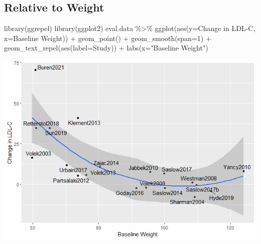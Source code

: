 \documentclass[
]{article}
\newenvironment{Shaded}{\begin{snugshade}}{\end{snugshade}}
\newcommand{\AttributeTok}[1]{\textcolor[rgb]{0.77,0.63,0.00}{#1}}
\newcommand{\DecValTok}[1]{\textcolor[rgb]{0.00,0.00,0.81}{#1}}
\newcommand{\FunctionTok}[1]{\textcolor[rgb]{0.00,0.00,0.00}{#1}}
\newcommand{\NormalTok}[1]{#1}
\newcommand{\SpecialCharTok}[1]{\textcolor[rgb]{0.00,0.00,0.00}{#1}}
\newcommand{\StringTok}[1]{\textcolor[rgb]{0.31,0.60,0.02}{#1}}
\begin{document}
\hypertarget{relative-to-weight}{%
\subsection{Relative to Weight}\label{relative-to-weight}}

\begin{Shaded}
\begin{Highlighting}[]
\FunctionTok{library}\NormalTok{(ggrepel)}
\FunctionTok{library}\NormalTok{(ggplot2)}
\NormalTok{eval.data }\SpecialCharTok{\%\textgreater{}\%}
  \FunctionTok{ggplot}\NormalTok{(}\FunctionTok{aes}\NormalTok{(}\AttributeTok{y=}\StringTok{\textasciigrave{}}\AttributeTok{Change in LDL{-}C}\StringTok{\textasciigrave{}}\NormalTok{,}
             \AttributeTok{x=}\StringTok{\textasciigrave{}}\AttributeTok{Baseline Weight}\StringTok{\textasciigrave{}}\NormalTok{)) }\SpecialCharTok{+}
  \FunctionTok{geom\_point}\NormalTok{() }\SpecialCharTok{+}
  \FunctionTok{geom\_smooth}\NormalTok{(}\AttributeTok{span=}\DecValTok{1}\NormalTok{) }\SpecialCharTok{+}
  \FunctionTok{geom\_text\_repel}\NormalTok{(}\FunctionTok{aes}\NormalTok{(}\AttributeTok{label=}\NormalTok{Study)) }\SpecialCharTok{+}
  \FunctionTok{labs}\NormalTok{(}\AttributeTok{x=}\StringTok{"Baseline Weight"}\NormalTok{)}
\end{Highlighting}
\end{Shaded}

\includegraphics{figures/ldl-change-vs-weight-1.png}
\end{document}
